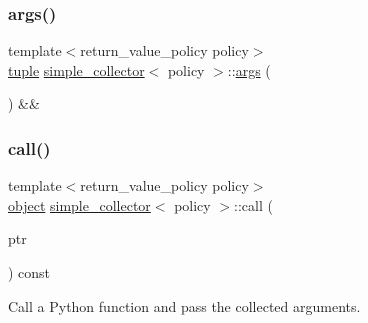 \mbox{\label{classsimple__collector_aaa12c5a3e17b5d49003ba6beaa676906}} 
\subsubsection{\texorpdfstring{args()}{args()}\hspace{0.1cm}{\footnotesize\ttfamily [2/2]}}
{\footnotesize\ttfamily template$<$return\+\_\+value\+\_\+policy policy$>$ \\
\mbox{\hyperlink{classtuple}{tuple}} \mbox{\hyperlink{classsimple__collector}{simple\+\_\+collector}}$<$ policy $>$\+::\mbox{\hyperlink{classargs}{args}} (\begin{DoxyParamCaption}{ }\end{DoxyParamCaption}) \&\&\hspace{0.3cm}{\ttfamily [inline]}}

\mbox{\label{classsimple__collector_aa5e692afd78c541e35034ff013d5ad1e}} 
\subsubsection{\texorpdfstring{call()}{call()}}
{\footnotesize\ttfamily template$<$return\+\_\+value\+\_\+policy policy$>$ \\
\mbox{\hyperlink{classobject}{object}} \mbox{\hyperlink{classsimple__collector}{simple\+\_\+collector}}$<$ policy $>$\+::call (\begin{DoxyParamCaption}\item[{\mbox{\hyperlink{_python27_2object_8h_aadc84ac7aed2cfa6f20c25f62bf3dac7}{Py\+Object}} $\ast$}]{ptr }\end{DoxyParamCaption}) const\hspace{0.3cm}{\ttfamily [inline]}}



Call a Python function and pass the collected arguments. 

\mbox{\label{classsimple__collector_a41400f1ddfad6849df25ef53f084762b}} 

